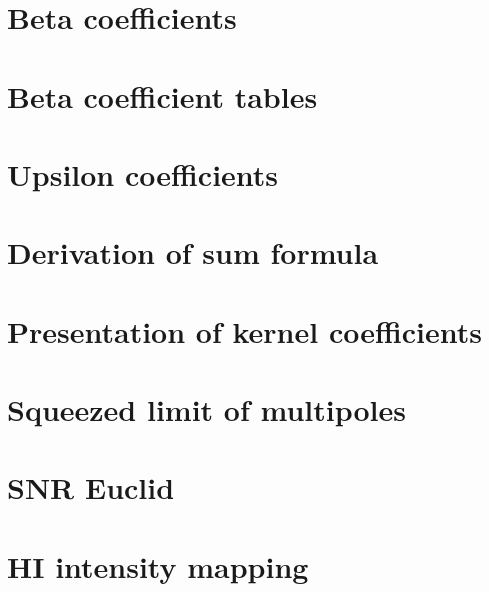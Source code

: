 \begin{appendices}
%
\chapter{Beta coefficients}
\label{app_betas}
%

%
\chapter{Beta coefficient tables}
\label{app_pnga}
%

%
\chapter{Upsilon coefficients}
\label{app_pngb}
%

%
\chapter{Derivation of sum formula}
\label{app_sum}
%

%
\chapter{Presentation of kernel coefficients}
\label{app_kernelpres}
%

%
\chapter{Squeezed limit of multipoles}
\label{app_sqlimmultip}
%

%
\chapter{SNR Euclid}
\label{app_euclid}
%

%
\chapter{HI intensity mapping}
\label{app_im}
%
% 
%
\end{appendices}
